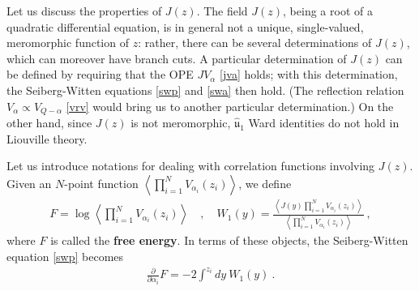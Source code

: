 \documentclass[12pt, a4paper, notitlepage, twoside]{report}
\numberwithin{equation}{section}
\theoremstyle{break}
\begin{document}
Let us discuss the properties of $J(z)$.
The field $J(z)$, being a root of a quadratic differential equation, is in general not a unique, single-valued, meromorphic function of $z$: rather, there can be several determinations of $J(z)$, which can moreover have branch cuts. 
A particular determination of $J(z)$ can be defined by requiring that the 
OPE $JV_\alpha$ \eqref{jva} holds; with this determination, the Seiberg-Witten equations \eqref{swp} and \eqref{swa} then hold.  
(The reflection relation $V_\alpha \propto V_{Q-\alpha}$ \eqref{vrv} would bring us to another particular determination.)
On the other hand, since $J(z)$ is not meromorphic, $\hat{\mathfrak{u}}_1$ Ward identities do not hold in Liouville theory.

Let us introduce notations for dealing with correlation functions involving $J(z)$. 
Given an $N$-point function $\left\langle \prod_{i=1}^N V_{\alpha_i}(z_i) \right\rangle$, we define
\begin{align}
 \boxed{F= \log \left\langle \prod_{i=1}^N V_{\alpha_i}(z_i) \right\rangle} \quad , \quad \boxed{W_1(y) = \frac{\left\langle J(y)\prod_{i=1}^N V_{\alpha_i}(z_i) \right\rangle}{\left\langle \prod_{i=1}^N V_{\alpha_i}(z_i) \right\rangle}} \ ,
\end{align}
where $F$ is called the \textbf{\boldmath free energy}. 
In terms of these objects, the Seiberg-Witten equation \eqref{swp} becomes 
\begin{align}
 {\frac{\partial}{\partial \alpha_i}} F = -2 \int^{z_i} dy \ W_1(y)\ . 
\label{daf}
\end{align}
\end{document}
